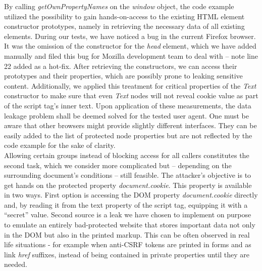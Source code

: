       By calling \textit{getOwnPropertyNames} on the \textit{window} object, the code example utilized the possibility to gain hands-on-access to the existing HTML element constructor prototypes, namely in retrieving the necessary data of all existing elements. During our tests, we have noticed a bug in the current Firefox browser. It was the omission of the constructor for the \textit{head} element, which we have added manually and filed this bug for Mozilla development team to deal with -- note line 22 added as a hot-fix. After retrieving the constructors, we can access their prototypes and their properties, which are possibly prone to leaking sensitive content. Additionally, we applied this treatment for critical properties of the \textit{Text} constructor to make sure that even \textit{Text} nodes will not reveal cookie value as part of the script tag's inner text. Upon application of these measurements, the data leakage problem shall be deemed solved for the tested user agent. One must be aware that other browsers might provide slightly different interfaces. They can be easily added to the list of protected node properties but are not reflected by the code example for the sake of clarity. \\

      Allowing certain groups instead of blocking access for all callers constitutes the second task, which we consider more complicated but -- depending on the surrounding document's conditions -- still feasible. The attacker's objective is to get hands on the protected property \textit{document.cookie}. This property is available in two ways. First option is accessing the DOM property \textit{document.cookie} directly and, by reading it from the text property of the script tag, equipping it with a ``secret'' value. Second source is a leak we have chosen to implement on purpose to emulate an entirely bad-protected website that stores important data  not only in the DOM but also in the printed markup. This can be often observed in real life situations - for example when anti-CSRF tokens are printed in forms and as link \textit{href} suffixes, instead of being contained in private properties until they are needed.\\

